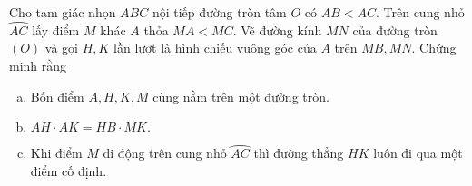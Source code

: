 \begin{bt}%
	Cho tam giác nhọn $ABC$ nội tiếp đường tròn tâm $O$ có $AB<AC.$ Trên cung nhỏ $\wideparen{AC}$ lấy điểm $M$ khác $A$ thỏa $MA<MC$. Vẽ đường kính $MN$ của đường tròn $(O)$ và gọi $H,K$ lần lượt là hình chiếu vuông góc của $A$ trên $MB,MN.$ Chứng minh rằng
	\begin{enumerate}[a)]
		\item Bốn điểm $A,H,K,M$ cùng nằm trên một đường tròn.
		\item $AH\cdot AK=HB \cdot MK.$
		\item Khi điểm $M$ di động trên cung nhỏ $\wideparen{AC}$ thì đường thẳng $HK$ luôn đi qua một điểm cố định.
	\end{enumerate}
\end{bt}

